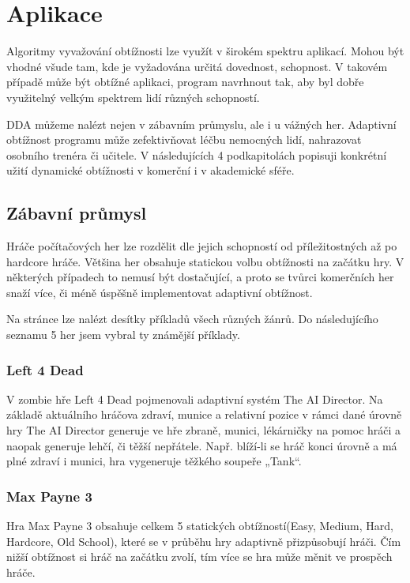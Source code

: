 \section{Aplikace} \label{sec:aplikacedda}

Algoritmy vyvažování obtížnosti lze využít v širokém spektru aplikací. Mohou být vhodné všude tam, kde je vyžadována určitá dovednost, schopnost. V takovém případě může být obtížné aplikaci, program navrhnout tak, aby byl dobře využitelný velkým spektrem lidí různých schopností.

DDA můžeme nalézt nejen v zábavním průmyslu, ale i u vážných her. Adaptivní obtížnost programu může zefektivňovat léčbu nemocných lidí, nahrazovat osobního trenéra či učitele. V následujících 4 podkapitolách popisuji konkrétní užití dynamické obtížnosti v komerční i v akademické sféře.

\subsection{Zábavní průmysl}

Hráče počítačových her lze rozdělit dle jejich schopností od příležitostných až po hardcore hráče. Většina her obsahuje statickou volbu obtížnosti na začátku hry. V některých případech to nemusí být dostačující, a proto se tvůrci komerčních her snaží více, či méně úspěšně implementovat adaptivní obtížnost.

Na stránce \cite{1} lze nalézt desítky příkladů všech různých žánrů. Do následujícího seznamu 5 her jsem vybral ty známější příklady.

\subsubsection{Left 4 Dead}
\label{sec:Left4Dead}

V zombie hře Left 4 Dead pojmenovali adaptivní systém The AI Director. Na základě aktuálního hráčova zdraví, munice a relativní pozice v rámci dané úrovně hry The AI Director generuje ve hře zbraně, munici, lékárničky na pomoc hráči a naopak generuje lehčí, či těžší nepřátele. Např. blíží-li se hráč konci úrovně a má plné zdraví i munici, hra vygeneruje těžkého soupeře „Tank“. \cite{2}

\subsubsection{Max Payne 3}

Hra Max Payne 3 obsahuje celkem 5 statických obtížností(Easy, Medium, Hard, Hardcore, Old School), které se v průběhu hry adaptivně přizpůsobují hráči. Čím nižší obtížnost si hráč na začátku zvolí, tím více se hra může měnit ve prospěch hráče.

